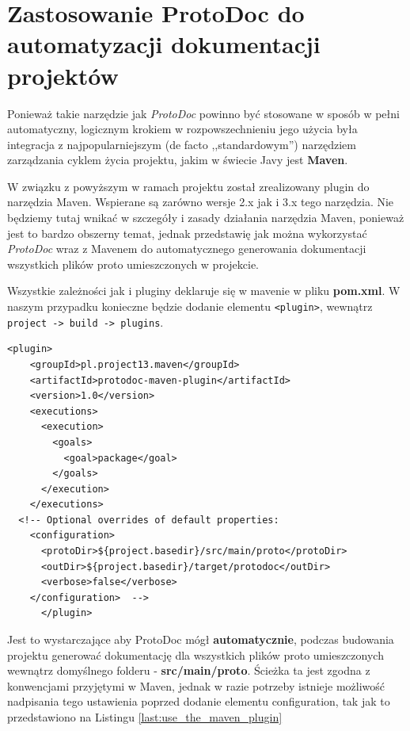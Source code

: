 \documentclass[pdflatex,11pt]{aghdpl}
\begin{document}
\chapter{Zastosowanie ProtoDoc do automatyzacji dokumentacji projektów}
\label{maven}

Ponieważ takie narzędzie jak \textit{ProtoDoc} powinno być stosowane w sposób w pełni automatyczny, logicznym krokiem w rozpowszechnieniu
jego użycia była integracja z najpopularniejszym (de facto ,,standardowym'') narzędziem zarządzania cyklem życia projektu, jakim w świecie Javy jest \textbf{Maven}.

W związku z powyższym w ramach projektu został zrealizowany plugin do narzędzia Maven. Wspierane są zarówno wersje 2.x jak i 3.x tego narzędzia. 
Nie będziemy tutaj wnikać w szczegóły i zasady działania narzędzia Maven, ponieważ jest to bardzo obszerny temat, jednak
przedstawię jak można wykorzystać \textit{ProtoDoc} wraz z Mavenem do automatycznego generowania dokumentacji wszystkich plików proto umieszczonych w projekcie.

Wszystkie zależności jak i pluginy deklaruje się w mavenie w pliku \textbf{pom.xml}. W naszym przypadku konieczne będzie dodanie elementu \verb|<plugin>|, wewnątrz
\verb|project -> build -> plugins|.

\begin{lstlisting}[caption={Deklaracja korzystania z pluginu ProtoDoc}, label={last:use_the_maven_plugin}]
      <plugin>
	<groupId>pl.project13.maven</groupId>
	<artifactId>protodoc-maven-plugin</artifactId>
	<version>1.0</version>
	<executions>
	  <execution>
	    <goals>
	      <goal>package</goal>
	    </goals>
	  </execution>
	</executions>
  <!-- Optional overrides of default properties:
	<configuration>
	  <protoDir>${project.basedir}/src/main/proto</protoDir>
	  <outDir>${project.basedir}/target/protodoc</outDir>
	  <verbose>false</verbose>
	</configuration>  -->
      </plugin>
\end{lstlisting}

Jest to wystarczające aby ProtoDoc mógł \textbf{automatycznie}, podczas budowania projektu generować dokumentację
dla wszystkich plików proto umieszczonych wewnątrz domyślnego folderu - \textbf{src/main/proto}. Ścieżka ta jest zgodna z konwencjami przyjętymi
w Maven, jednak w razie potrzeby istnieje możliwość nadpisania tego ustawienia poprzed dodanie elementu configuration, tak jak to przedstawiono na Listingu \ref{last:use_the_maven_plugin}
\end{document}
